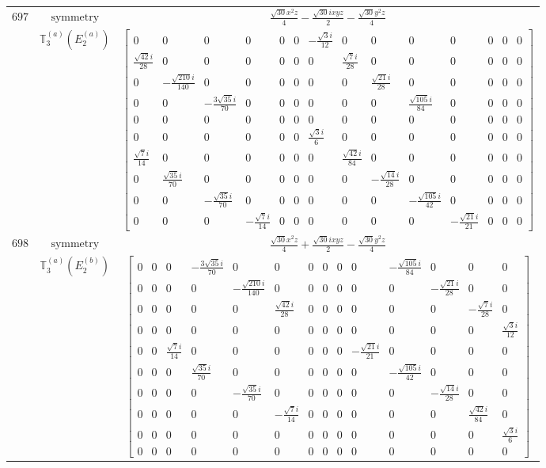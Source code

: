 \documentclass[fleqn,8pt,landscape]{jsarticle}
\begin{document}
\begin{longtable}{ccc}
$ 697 $ & $ \text{symmetry} $ & $ \frac{\sqrt{30} x^{2} z}{4} - \frac{\sqrt{30} i x y z}{2} - \frac{\sqrt{30} y^{2} z}{4} $ \\
$  $ & $ \mathbb{T}_{3}^{(a)}(E_{2}^{(a)}) $ & $ \begin{bmatrix} 0 & 0 & 0 & 0 & 0 & 0 & - \frac{\sqrt{3} i}{12} & 0 & 0 & 0 & 0 & 0 & 0 & 0 \\ \frac{\sqrt{42} i}{28} & 0 & 0 & 0 & 0 & 0 & 0 & \frac{\sqrt{7} i}{28} & 0 & 0 & 0 & 0 & 0 & 0 \\ 0 & - \frac{\sqrt{210} i}{140} & 0 & 0 & 0 & 0 & 0 & 0 & \frac{\sqrt{21} i}{28} & 0 & 0 & 0 & 0 & 0 \\ 0 & 0 & - \frac{3 \sqrt{35} i}{70} & 0 & 0 & 0 & 0 & 0 & 0 & \frac{\sqrt{105} i}{84} & 0 & 0 & 0 & 0 \\ 0 & 0 & 0 & 0 & 0 & 0 & 0 & 0 & 0 & 0 & 0 & 0 & 0 & 0 \\ 0 & 0 & 0 & 0 & 0 & 0 & \frac{\sqrt{3} i}{6} & 0 & 0 & 0 & 0 & 0 & 0 & 0 \\ \frac{\sqrt{7} i}{14} & 0 & 0 & 0 & 0 & 0 & 0 & \frac{\sqrt{42} i}{84} & 0 & 0 & 0 & 0 & 0 & 0 \\ 0 & \frac{\sqrt{35} i}{70} & 0 & 0 & 0 & 0 & 0 & 0 & - \frac{\sqrt{14} i}{28} & 0 & 0 & 0 & 0 & 0 \\ 0 & 0 & - \frac{\sqrt{35} i}{70} & 0 & 0 & 0 & 0 & 0 & 0 & - \frac{\sqrt{105} i}{42} & 0 & 0 & 0 & 0 \\ 0 & 0 & 0 & - \frac{\sqrt{7} i}{14} & 0 & 0 & 0 & 0 & 0 & 0 & - \frac{\sqrt{21} i}{21} & 0 & 0 & 0 \end{bmatrix} $ \\ \hline
$ 698 $ & $ \text{symmetry} $ & $ \frac{\sqrt{30} x^{2} z}{4} + \frac{\sqrt{30} i x y z}{2} - \frac{\sqrt{30} y^{2} z}{4} $ \\
$  $ & $ \mathbb{T}_{3}^{(a)}(E_{2}^{(b)}) $ & $ \begin{bmatrix} 0 & 0 & 0 & - \frac{3 \sqrt{35} i}{70} & 0 & 0 & 0 & 0 & 0 & 0 & - \frac{\sqrt{105} i}{84} & 0 & 0 & 0 \\ 0 & 0 & 0 & 0 & - \frac{\sqrt{210} i}{140} & 0 & 0 & 0 & 0 & 0 & 0 & - \frac{\sqrt{21} i}{28} & 0 & 0 \\ 0 & 0 & 0 & 0 & 0 & \frac{\sqrt{42} i}{28} & 0 & 0 & 0 & 0 & 0 & 0 & - \frac{\sqrt{7} i}{28} & 0 \\ 0 & 0 & 0 & 0 & 0 & 0 & 0 & 0 & 0 & 0 & 0 & 0 & 0 & \frac{\sqrt{3} i}{12} \\ 0 & 0 & \frac{\sqrt{7} i}{14} & 0 & 0 & 0 & 0 & 0 & 0 & - \frac{\sqrt{21} i}{21} & 0 & 0 & 0 & 0 \\ 0 & 0 & 0 & \frac{\sqrt{35} i}{70} & 0 & 0 & 0 & 0 & 0 & 0 & - \frac{\sqrt{105} i}{42} & 0 & 0 & 0 \\ 0 & 0 & 0 & 0 & - \frac{\sqrt{35} i}{70} & 0 & 0 & 0 & 0 & 0 & 0 & - \frac{\sqrt{14} i}{28} & 0 & 0 \\ 0 & 0 & 0 & 0 & 0 & - \frac{\sqrt{7} i}{14} & 0 & 0 & 0 & 0 & 0 & 0 & \frac{\sqrt{42} i}{84} & 0 \\ 0 & 0 & 0 & 0 & 0 & 0 & 0 & 0 & 0 & 0 & 0 & 0 & 0 & \frac{\sqrt{3} i}{6} \\ 0 & 0 & 0 & 0 & 0 & 0 & 0 & 0 & 0 & 0 & 0 & 0 & 0 & 0 \end{bmatrix} $ \\ \hline

\end{longtable}
\end{document}
